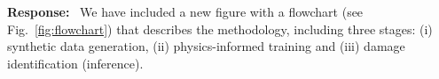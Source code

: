 \documentclass[11pt]{article}
\newenvironment{response}{\par\smallskip\noindent\color{resp}\textbf{Response:}\ }{\par}
\begin{document}
\begin{response}
We have included a new figure with a flowchart (see Fig.~\ref{fig:flowchart}) that describes the methodology, including three stages: (i) synthetic data generation, (ii) physics-informed training and (iii) damage identification (inference). 
\end{response}
\end{document}
